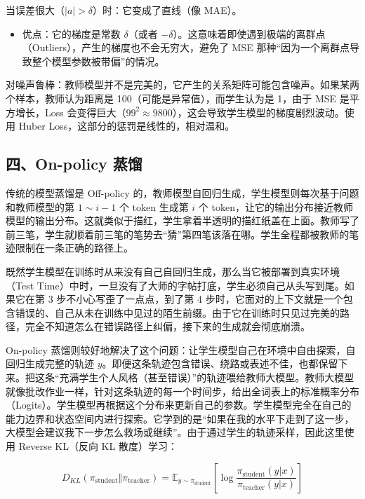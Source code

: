 当误差很大（\(|a| > \delta\)）时：它变成了直线（像 MAE）。

\begin{itemize}
\tightlist
\item
  优点：它的梯度是常数 \(\delta\)（或者 \(-\delta\)）。这意味着即使遇到极端的离群点（Outliers），产生的梯度也不会无穷大，避免了 MSE 那种``因为一个离群点导致整个模型参数被带偏''的情况。
\end{itemize}

对噪声鲁棒：教师模型并不是完美的，它产生的关系矩阵可能包含噪声。如果某两个样本，教师认为距离是 100（可能是异常值），而学生认为是 1，由于 MSE 是平方增长，Loss 会变得巨大（\(99^2 \approx 9800\)），这会导致学生模型的梯度剧烈波动。使用 Huber Loss，这部分的惩罚是线性的，相对温和。

\hypertarget{ux56dbon-policy-ux84b8ux998f}{%
\subsection{四、On-policy 蒸馏}\label{ux56dbon-policy-ux84b8ux998f}}

传统的模型蒸馏是 Off-policy 的，教师模型自回归生成，学生模型则每次基于问题和教师模型的第 \(1 \sim i-1\) 个 token 生成第 \(i\) 个 token，让它的输出分布接近教师模型的输出分布。这就类似于描红，学生拿着半透明的描红纸盖在上面。教师写了前三笔，学生就顺着前三笔的笔势去``猜''第四笔该落在哪。学生全程都被教师的笔迹限制在一条正确的路径上。

既然学生模型在训练时从来没有自己自回归生成，那么当它被部署到真实环境（Test Time）中时，一旦没有了大师的字帖打底，学生必须自己从头写到尾。如果它在第 3 步不小心写歪了一点点，到了第 4 步时，它面对的上下文就是一个包含错误的、自己从未在训练中见过的陌生前缀。由于它在训练时只见过完美的路径，完全不知道怎么在错误路径上纠偏，接下来的生成就会彻底崩溃。

On-policy 蒸馏则较好地解决了这个问题：让学生模型自己在环境中自由探索，自回归生成完整的轨迹 \(y\)。即便这条轨迹包含错误、绕路或表述不佳，也都保留下来。把这条``充满学生个人风格（甚至错误）''的轨迹喂给教师大模型。教师大模型就像批改作业一样，针对这条轨迹的每一个时间步，给出全词表上的标准概率分布（Logits）。学生模型再根据这个分布来更新自己的参数。学生模型完全在自己的能力边界和状态空间内进行探索。它学到的是``如果在我的水平下走到了这一步，大模型会建议我下一步怎么救场或继续''。由于通过学生的轨迹采样，因此这里使用 Reverse KL（反向 KL 散度）学习：

\[
D_{KL}(\pi_{\mathrm{student}} \Vert \pi_{\mathrm{teacher}}) = \mathbb{E}_{y \sim \pi_{\mathrm{student}}}\left[\log \frac{\pi_{\mathrm{student}}(y|x)}{\pi_{\mathrm{teacher}}(y|x)}\right]
\]


